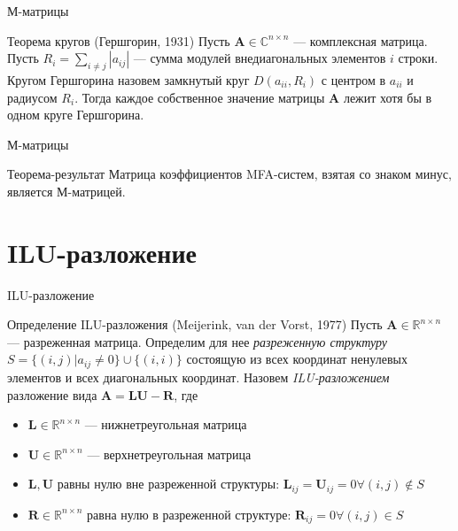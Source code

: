 \documentclass[aspectratio=169]{beamer}
\begin{document}
\begin{frame}{М-матрицы}
\begin{block}{Теорема кругов (Гершгорин, 1931)}
	Пусть $\mathbf{A} \in \mathbb{C}^{n \times n}$ --- комплексная матрица. Пусть $R_i = \sum_{i \neq j} |a_{ij}|$ --- сумма модулей внедиагональных элементов $i$ строки. Кругом Гершгорина назовем замкнутый круг $D(a_{ii}, R_i)$ с центром в $a_{ii}$ и радиусом $R_i$. Тогда каждое собственное значение матрицы $\mathbf{A}$ лежит хотя бы в одном круге Гершгорина. 
\end{block}
\end{frame}

\begin{frame}{М-матрицы}
\begin{block}{Теорема-результат}
	Матрица коэффициентов MFA-систем, взятая со знаком минус, является М-матрицей.
\end{block}
\end{frame}

\section{ILU-разложение}
\begin{frame}{ILU-разложение}
\begin{block}{Определение ILU-разложения (Meijerink, van der Vorst, 1977)}
	Пусть $\mathbf{A} \in \mathbb{R}^{n \times n}$ --- разреженная матрица. Определим для нее \emph{разреженную структуру} $S = \{(i, j) | a_{ij} \neq 0\} \cup \{(i,i)\}$ состоящую из всех координат ненулевых элементов и всех диагональных координат. Назовем \emph{ILU-разложением} разложение вида $\mathbf{A} = \mathbf{L}\mathbf{U} - \mathbf{R}$, где
	\begin{itemize}
		\item $\mathbf{L} \in \mathbb{R}^{n \times n}$ --- нижнетреугольная матрица
		\item $\mathbf{U} \in \mathbb{R}^{n \times n}$ --- верхнетреугольная матрица
		\item $\mathbf{L}, \mathbf{U}$ равны нулю вне разреженной структуры: $\mathbf{L}_{ij} = \mathbf{U}_{ij} = 0 \forall (i, j) \notin S$
		\item $\mathbf{R} \in \mathbb{R}^{n \times n}$ равна нулю в разреженной структуре: $\mathbf{R}_{ij} = 0 \forall (i, j) \in S$
	\end{itemize}
\end{block}
\end{frame}
\end{document}
